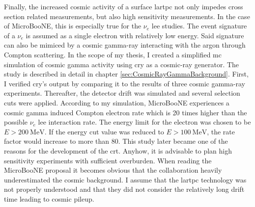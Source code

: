 Finally, the increased cosmic activity of a surface \gls{lartpc} not only impedes cross section related measurements, but also high sensitivity measurements. In the case of MicroBooNE, this is especially true for the $\nu_e$ \gls{lee} studies. The event signature of a $\nu_e$ is assumed as a single electron with relatively low energy. Said signature can also be mimiced by a cosmic gamma-ray interacting with the argon through Compton scattering. In the scope of my thesis, I created a simplified \gls{mc} simulation of cosmic gamma activity using \gls{cry} as a cosmic-ray generator. The study is described in detail in chapter \ref{sec:CosmicRayGammaBackground}. First, I verified \gls{cry}'s output by comparing it to the results of three cosmic gamma-ray experiments. Thereafter, the detector drift was simulated and several selection cuts were applied. According to my simulation, MicroBooNE experiences a cosmic gamma induced Compton electron rate which is 20 times higher than the possible $\nu_e$ \gls{lee} interaction rate. The energy limit for the electron was chosen to be $E > \SI{200}{\mega\electronvolt}$. If the energy cut value was reduced to $E > \SI{100}{\mega\electronvolt}$, the rate factor would increase to more than 80. This study later became one of the reasons for the development of the \gls{crt}. Anyhow, it is advisable to plan high sensitivity experiments with sufficient overburden. When reading the MicroBooNE proposal \cite{MicroBooNEProposal1,MicroBooNEProposal2} it becomes obvious that the collaboration heavily underestimated the cosmic background. I assume that the \gls{lartpc} technology was not properly understood and that they did not consider the relatively long drift time leading to cosmic pileup.
